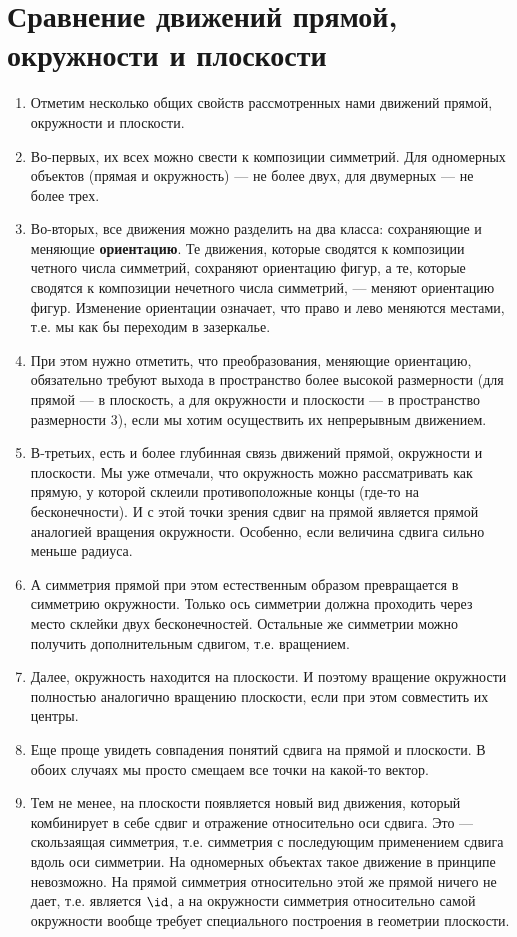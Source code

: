 \section{Сравнение движений прямой, окружности и плоскости}



\begin{enumerate}
\item Отметим несколько общих свойств рассмотренных нами движений прямой, окружности и плоскости.
\item Во-первых, их всех можно свести к композиции симметрий. Для одномерных объектов (прямая и окружность) --- не более двух, для двумерных --- не более трех.
\item Во-вторых, все движения можно разделить на два класса: сохраняющие и меняющие \textbf{ориентацию}. Те движения, которые сводятся к композиции четного числа симметрий, сохраняют ориентацию фигур, а те, которые сводятся к композиции нечетного числа симметрий, --- меняют ориентацию фигур. Изменение ориентации означает, что право и лево меняются местами, т.е. мы как бы переходим в зазеркалье. 
\item При этом нужно отметить, что преобразования, меняющие ориентацию, обязательно требуют выхода в пространство более высокой размерности (для прямой --- в плоскость, а для окружности и плоскости --- в пространство размерности 3), если мы хотим осуществить их непрерывным движением.
\item В-третьих, есть и более глубинная связь движений прямой, окружности и плоскости. Мы уже отмечали, что окружность можно рассматривать как прямую, у которой склеили противоположные концы (где-то на бесконечности). И с этой точки зрения сдвиг на прямой является прямой аналогией вращения окружности. Особенно, если величина сдвига сильно меньше радиуса.
\item А симметрия прямой при этом естественным образом превращается в симметрию окружности. Только ось симметрии должна проходить через место склейки двух бесконечностей. Остальные же симметрии можно получить дополнительным сдвигом, т.е. вращением.
\item Далее, окружность находится на плоскости. И поэтому вращение окружности полностью аналогично вращению плоскости, если при этом совместить их центры.
\item Еще проще увидеть совпадения понятий сдвига на прямой и плоскости. В обоих случаях мы просто смещаем все точки на какой-то вектор.
\item Тем не менее, на плоскости появляется новый вид движения, который комбинирует в себе сдвиг и отражение относительно оси сдвига. Это --- скользаящая симметрия, т.е. симметрия с последующим применением сдвига вдоль оси симметрии. На одномерных объектах такое движение в принципе невозможно. На прямой симметрия относительно этой же прямой ничего не дает, т.е. является $\id$, а на окружности симметрия относительно самой окружности вообще требует специального построения в геометрии плоскости.
\end{enumerate}




